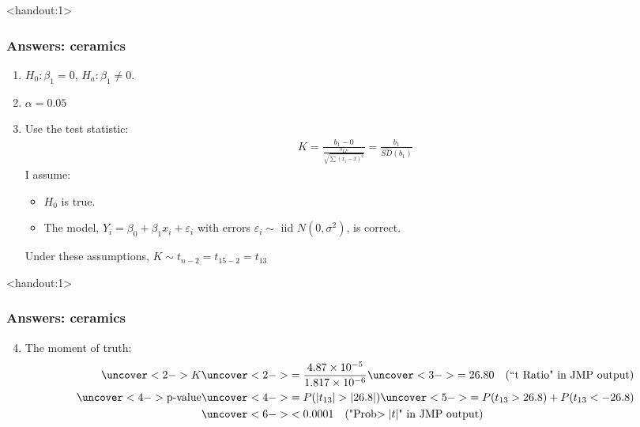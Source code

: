 \documentclass[handout]{beamer}\usepackage{graphicx, color}
\newcommand{\answers}{1}
\providecommand{\e}{\varepsilon}
\providecommand{\ov}[1]{\overline{#1}}
\providecommand{\wh}[1]{\widehat{#1}}
\numberwithin{equation}{section}
\begin{document}
\begin{frame}<handout:\answers>
\frametitle{Answers: ceramics} \small
\begin{enumerate}[1. ]
\item $H_0: \beta_1 = 0$, $H_a: \beta_1 \ne 0$.
\pause \item $\alpha = 0.05$
\pause \item Use the test statistic:
\pause \begin{align*}
K = \frac{b_1 - 0}{\frac{s_{LF}}{\sqrt{\sum(x_i - \ov{x})^2}}} = \frac{b_1}{\wh{SD}(b_1)}
\end{align*}
\pause I assume:
\begin{itemize}
\pause \item $H_0$ is true.
\pause \item The model, $Y_i = \beta_0 + \beta_1 x_i + \e_i$ with errors $\e_i \sim$ iid $N(0, \sigma^2)$, is correct.  
\end{itemize}
Under these assumptions, $K \sim t_{n - 2} = t_{15 - 2} = t_{13}$
\end{enumerate}
\end{frame}


\begin{frame}<handout:\answers>
\frametitle{Answers: ceramics} \small
\begin{enumerate}
\setcounter{enumi}{3}
\item  The moment of truth: 
\begin{align*}
\uncover<2->{K} & \uncover<2->{= \frac{4.87 \times 10^{-5}}{1.817 \times 10^{-6}}} \uncover<3->{= 26.80 \quad \text{(``t Ratio" in JMP output)}} \\
\uncover<4->{\text{p-value}} & \uncover<4->{= P(|t_{13}| > |26.8|)} \uncover<5->{ = P(t_{13} > 26.8) + P(t_{13} < - 26.8)} \\
&\uncover<6->{< 0.0001 \quad (\text{"Prob$>|t|$" in JMP output})}
\end{align*}
\end{enumerate}
\end{frame}
\end{document}
